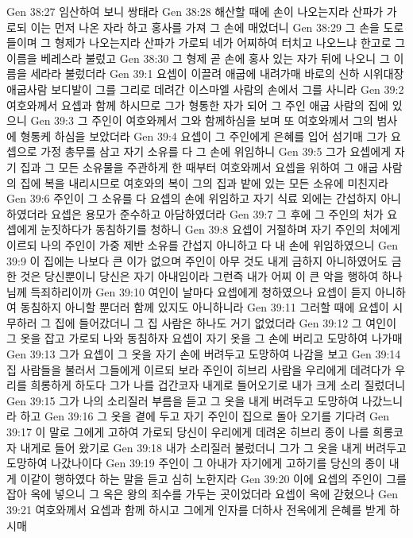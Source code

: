 Gen 38:27  임산하여 보니 쌍태라
Gen 38:28  해산할 때에 손이 나오는지라 산파가 가로되 이는 먼저 나온 자라 하고 홍사를 가져 그 손에 매었더니
Gen 38:29  그 손을 도로 들이며 그 형제가 나오는지라 산파가 가로되 네가 어찌하여 터치고 나오느냐 한고로 그 이름을 베레스라 불렀고
Gen 38:30  그 형제 곧 손에 홍사 있는 자가 뒤에 나오니 그 이름을 세라라 불렀더라
Gen 39:1  요셉이 이끌려 애굽에 내려가매 바로의 신하 시위대장 애굽사람 보디발이 그를 그리로 데려간 이스마엘 사람의 손에서 그를 사니라
Gen 39:2  여호와께서 요셉과 함께 하시므로 그가 형통한 자가 되어 그 주인 애굽 사람의 집에 있으니
Gen 39:3  그 주인이 여호와께서 그와 함께하심을 보며 또 여호와께서 그의 범사에 형통케 하심을 보았더라
Gen 39:4  요셉이 그 주인에게 은혜를 입어 섬기매 그가 요셉으로 가정 총무를 삼고 자기 소유를 다 그 손에 위임하니
Gen 39:5  그가 요셉에게 자기 집과 그 모든 소유물을 주관하게 한 때부터 여호와께서 요셉을 위하여 그 애굽 사람의 집에 복을 내리시므로 여호와의 복이 그의 집과 밭에 있는 모든 소유에 미친지라
Gen 39:6  주인이 그 소유를 다 요셉의 손에 위임하고 자기 식료 외에는 간섭하지 아니하였더라 요셉은 용모가 준수하고 아담하였더라
Gen 39:7  그 후에 그 주인의 처가 요셉에게 눈짓하다가 동침하기를 청하니
Gen 39:8  요셉이 거절하며 자기 주인의 처에게 이르되 나의 주인이 가중 제반 소유를 간섭지 아니하고 다 내 손에 위임하였으니
Gen 39:9  이 집에는 나보다 큰 이가 없으며 주인이 아무 것도 내게 금하지 아니하였어도 금한 것은 당신뿐이니 당신은 자기 아내임이라 그런즉 내가 어찌 이 큰 악을 행하여 하나님께 득죄하리이까
Gen 39:10  여인이 날마다 요셉에게 청하였으나 요셉이 듣지 아니하여 동침하지 아니할 뿐더러 함께 있지도 아니하니라
Gen 39:11  그러할 때에 요셉이 시무하러 그 집에 들어갔더니 그 집 사람은 하나도 거기 없었더라
Gen 39:12  그 여인이 그 옷을 잡고 가로되 나와 동침하자 요셉이 자기 옷을 그 손에 버리고 도망하여 나가매
Gen 39:13  그가 요셉이 그 옷을 자기 손에 버려두고 도망하여 나감을 보고
Gen 39:14  집 사람들을 불러서 그들에게 이르되 보라 주인이 히브리 사람을 우리에게 데려다가 우리를 희롱하게 하도다 그가 나를 겁간코자 내게로 들어오기로 내가 크게 소리 질렀더니
Gen 39:15  그가 나의 소리질러 부름을 듣고 그 옷을 내게 버려두고 도망하여 나갔느니라 하고
Gen 39:16  그 옷을 곁에 두고 자기 주인이 집으로 돌아 오기를 기다려
Gen 39:17  이 말로 그에게 고하여 가로되 당신이 우리에게 데려온 히브리 종이 나를 희롱코자 내게로 들어 왔기로
Gen 39:18  내가 소리질러 불렀더니 그가 그 옷을 내게 버려두고 도망하여 나갔나이다
Gen 39:19  주인이 그 아내가 자기에게 고하기를 당신의 종이 내게 이같이 행하였다 하는 말을 듣고 심히 노한지라
Gen 39:20  이에 요셉의 주인이 그를 잡아 옥에 넣으니 그 옥은 왕의 죄수를 가두는 곳이었더라 요셉이 옥에 갇혔으나
Gen 39:21  여호와께서 요셉과 함께 하시고 그에게 인자를 더하사 전옥에게 은혜를 받게 하시매
